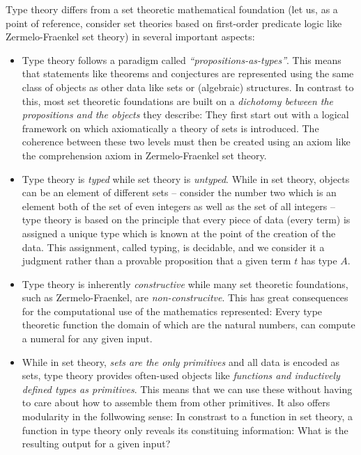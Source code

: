 Type theory differs from a set theoretic mathematical foundation (let us, as a
point of reference, consider set theories based on first-order predicate logic
like Zermelo-Fraenkel set theory) in several
important aspects:
\begin{itemize}
\item Type theory follows a paradigm called \emph{``propositions-as-types''}.
This means that statements like theorems and conjectures are represented
using the same class of objects as other data like sets or (algebraic) structures.
In contrast to this, most set theoretic foundations are built on a \emph{dichotomy between
the propositions and the objects} they describe:
They first start out with a logical framework on which axiomatically a theory
of sets is introduced.
The coherence between these two levels must then be created using an axiom like
the comprehension axiom in Zermelo-Fraenkel set theory.
\item Type theory is \emph{typed} while set theory is \emph{untyped}.
While in set theory, objects can be an element of different sets --
consider the number two which is an element both of the set of even integers
as well as the set of all integers --
type theory is based on the principle that every piece of data (every term)
is assigned a unique type which is known at the point of the creation of the data.
This assignment, called typing, is decidable, and we consider it a judgment
rather than a provable proposition that a given term $t$ has type $A$.
\item Type theory is inherently \emph{constructive} while many
set theoretic foundations, such as Zermelo-Fraenkel, are \emph{non-construcitve}.
This has great consequences for the computational use of the mathematics represented:
Every type theoretic function the domain of which are the natural numbers, can compute a
numeral for any given input.
\item While in set theory, \emph{sets are the only primitives} and all data is
encoded as sets, type theory
provides often-used objects like \emph{functions and inductively defined types
as primitives}.
This means that we can use these without having to care about how to assemble them
from other primitives. 
It also offers modularity in the follwowing sense: %
In constrast to a function in set theory, a function in type theory only reveals
its constituing information:
What is the resulting output for a given input?
\end{itemize} %

